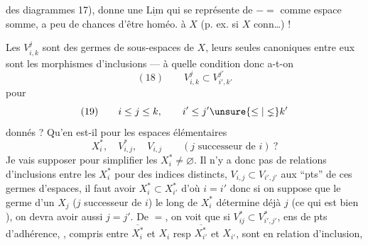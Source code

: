 des diagrammes 17), donne une $\underline{\mathrm{Lim}}$ qui se
représente de $-=$ comme espace somme, a peu
de chances d'être homéo. à $X$ (p. ex. si $X$ conn\ldots) !

Les $V_{i,k}^j$ sont des germes de sous-espaces
de $X$, leurs seules   canoniques
entre eux sont les morphismes d'inclusions
— à quelle condition donc a-t-on
\[
(18)\qquad V_{i,k}^j\subset V_{i',k'}^{j'}
\]
pour
\[
(19)\qquad i\leq j\leq k,\qquad i'\leq j'\unsure{\leq|\lneq}k'
\]
donnés ? Qu'en est-il pour les espaces
élémentaires
\[
X_i^*,\quad V_{i,j}^*,\quad V_{i,j}\qquad(j\text{ successeur de }i)\ ?
\]
Je vais supposer pour simplifier les $X_i^*\ne\varnothing$.
Il n'y a donc pas de relations d'inclusions entre
les $X_i^*$ pour des indices distincts,  
$V_{i,j}\subset V_{i',j'}$  aux ``pts''  de ces germes
d'espaces, il faut avoir $X_i^*\subset X_{i'}^*$ d'où $i=i'$
donc si on suppose que le germe d'un
$X_j$ ($j$ successeur de $i$) le long de $X_i^*$ détermine
déjà $j$ (ce qui est bien ), on
devra avoir aussi $j=j'$. De $=$, on voit que
si $V_{ij}^*\subset V_{i',j'}^*$,  ens de pts d'adhérence,
, compris entre $\overline{X_i^*}$ et $X_i$
resp $\overline{X_{i'}^*}$ et $X_{i'}$, sont en relation d'inclusion,
